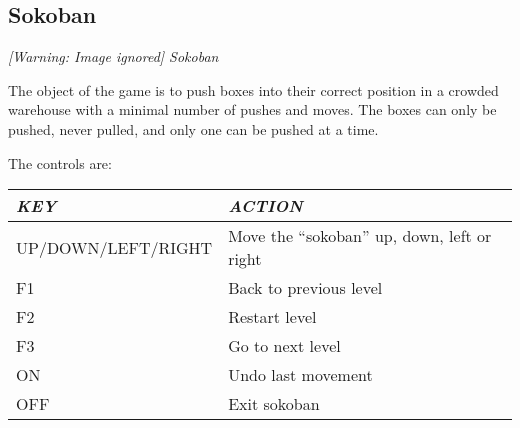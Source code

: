 \subsection{Sokoban}
{\centering\itshape
  [Warning: Image ignored] %
 \newline
Sokoban
\par}

The object of the game is to push boxes into their correct position in a
crowded warehouse with a minimal number of pushes and moves. The boxes
can only be pushed, never pulled, and only one can be pushed at a time.

The controls are:

\begin{tabular}[c]{|p{5.25cm}|p{10.341001cm}|}
\hline
{\centering\bfseries\itshape
KEY
\par}
&
{\centering\bfseries\itshape
ACTION
\par}
\\\hline
{\centering
UP/DOWN/LEFT/RIGHT
\par}
&
Move the ``sokoban'' up, down, left or right
\\\hline
{\centering
F1
\par}
&
Back to previous level
\\\hline
{\centering
F2
\par}
&
Restart level
\\\hline
{\centering
F3
\par}
&
Go to next level
\\\hline
{\centering
ON
\par}
&
Undo last movement
\\\hline
{\centering
OFF
\par}
&
Exit sokoban
\\\hline
\end{tabular}


